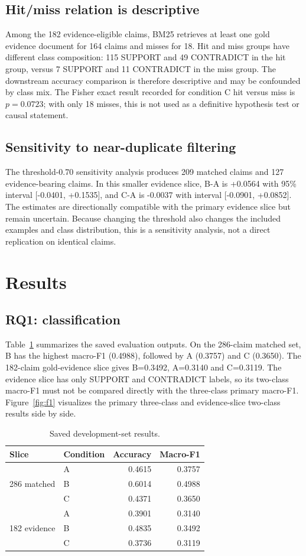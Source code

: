 \documentclass[10pt]{article}
\begin{document}
\subsection{Hit/miss relation is descriptive}
Among the 182 evidence-eligible claims, BM25 retrieves at least one gold evidence document for 164 claims and misses for 18. Hit and miss groups have different class composition: 115 SUPPORT and 49 CONTRADICT in the hit group, versus 7 SUPPORT and 11 CONTRADICT in the miss group. The downstream accuracy comparison is therefore descriptive and may be confounded by class mix. The Fisher exact result recorded for condition C hit versus miss is $p=0.0723$; with only 18 misses, this is not used as a definitive hypothesis test or causal statement.

\subsection{Sensitivity to near-duplicate filtering}
The threshold-0.70 sensitivity analysis produces 209 matched claims and 127 evidence-bearing claims. In this smaller evidence slice, B-A is +0.0564 with 95\% interval [-0.0401, +0.1535], and C-A is -0.0037 with interval [-0.0901, +0.0852]. The estimates are directionally compatible with the primary evidence slice but remain uncertain. Because changing the threshold also changes the included examples and class distribution, this is a sensitivity analysis, not a direct replication on identical claims.

\section{Results}
\subsection{RQ1: classification}
Table~\ref{tab:main} summarizes the saved evaluation outputs. On the 286-claim matched set, B has the highest macro-F1 (0.4988), followed by A (0.3757) and C (0.3650). The 182-claim gold-evidence slice gives B=0.3492, A=0.3140 and C=0.3119. The evidence slice has only SUPPORT and CONTRADICT labels, so its two-class macro-F1 must not be compared directly with the three-class primary macro-F1. Figure~\ref{fig:f1} visualizes the primary three-class and evidence-slice two-class results side by side.

\begin{table}[t]
\centering\small
\caption{Saved development-set results.}
\label{tab:main}
\begin{tabular}{llrr}
\toprule
Slice & Condition & Accuracy & Macro-F1\\
\midrule
\multirow{3}{*}{286 matched} & A & 0.4615 & 0.3757\\
& B & 0.6014 & 0.4988\\
& C & 0.4371 & 0.3650\\
\midrule
\multirow{3}{*}{182 evidence} & A & 0.3901 & 0.3140\\
& B & 0.4835 & 0.3492\\
& C & 0.3736 & 0.3119\\
\bottomrule
\end{tabular}
\end{table}
\end{document}
